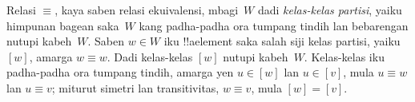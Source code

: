 \documentclass[../../../include/open-logic-section]{subfiles}
\begin{document}
Relasi $\equiv$, kaya saben relasi ekuivalensi, mbagi~$W$ dadi
\emph{kelas-kelas partisi}, yaiku himpunan bagean saka~$W$ kang
padha-padha ora tumpang tindih lan bebarengan nutupi kabeh~$W$.
Saben $w \in W$ iku !!a{element} saka salah siji kelas partisi,
yaiku~$[w]$, amarga $w \equiv w$. Dadi kelas-kelas $[w]$ nutupi
kabeh~$W$. Kelas-kelas iku padha-padha ora tumpang tindih, amarga yen
$u \in [w]$ lan $u \in [v]$, mula $u \equiv w$ lan $u \equiv v$;
miturut simetri lan transitivitas, $w \equiv v$, mula $[w] = [v]$.
\end{document}

